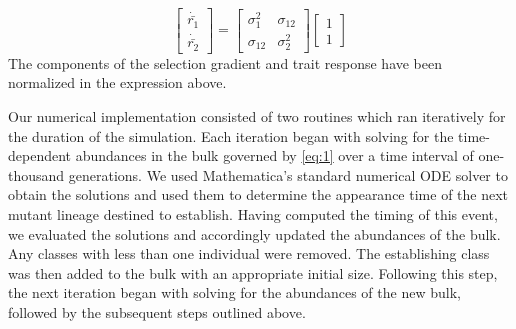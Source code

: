 \documentclass[11pt,twocolumn]{article}
\newcommand{\G}{\textbf{G}}
\begin{document}
% 
% 
% 
% 
% 
% 
\begin{equation}\label{eq:5}
\left[
\begin{array}{c}
\dot{\bar{r_1}} \\
\dot{\bar{r_2}} 
\end{array}
\right]
=
\left[
\begin{array}{cc}
\sigma_1^2 & \sigma_{12} \\
\sigma_{12} & \sigma_2^2 
\end{array}
\right]
\left[
\begin{array}{c}
1 \\
1 
\end{array}
\right]
\end{equation}
The components of the selection gradient and trait response have been normalized in the expression above. \par

Our numerical implementation consisted of two routines which ran iteratively for the duration of the simulation. Each iteration began with solving for the time-dependent abundances in the bulk governed by \eqref{eq:1} over a time interval of one-thousand generations. We used Mathematica's standard numerical ODE solver to obtain the solutions and used them to determine the appearance time of the next mutant lineage destined to establish. Having computed the timing of this event, we evaluated the solutions and accordingly updated the abundances of the bulk. Any classes with less than one individual were removed.  The establishing class was then added to the bulk with an appropriate initial size. Following this step, the next iteration began with solving for the abundances of the new bulk, followed by the subsequent steps outlined above.\par
\end{document}

